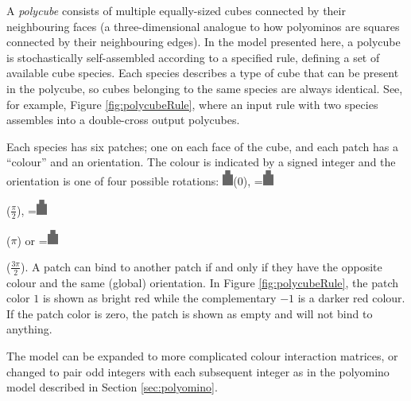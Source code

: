 A \emph{polycube} consists of multiple equally-sized cubes connected by their neighbouring faces (a three-dimensional analogue to how polyominos are squares connected by their neighbouring edges). In the model presented here, a polycube is stochastically self-assembled according to a specified rule, defining a set of available cube species. Each species describes a type of cube that can be present in the polycube, so cubes belonging to the same species are always identical. See, for example, Figure \ref{fig:polycubeRule}, where an input rule with two species assembles into a double-cross output polycubes.

Each species has six patches; one on each face of the cube, and each patch has a ``colour'' and an orientation. The colour is indicated by a signed integer and the orientation is one of four possible rotations: \includegraphics[width=10pt]{figures/face.eps}\hspace{4pt}(\(0\)),
\begingroup{}=\hbox{\includegraphics[width=10pt,angle=-90]{figures/face.eps}}\parbox{\wd0}{}\endgroup\hspace{4pt}(\(\frac{\pi}{2}\)),
\begingroup{}=\hbox{\includegraphics[width=10pt,angle=180]{figures/face.eps}}\parbox{\wd0}{}\endgroup\hspace{4pt}(\(\pi\)) or
\begingroup{}=\hbox{\includegraphics[width=10pt,angle=90]{figures/face.eps}}\parbox{\wd0}{}\endgroup\hspace{4pt}(\(\frac{3\pi}{2}\)). A patch can bind to another patch if and only if they have the opposite colour and the same (global) orientation. In Figure \ref{fig:polycubeRule}, the patch color \(1\) is shown as bright red while the complementary \(-1\) is a darker red colour.  If the patch color is zero, the patch is shown as empty and will not bind to anything.

The model can be expanded to more complicated colour interaction matrices, or changed to pair odd integers with each subsequent integer as in the polyomino model\cite{ahnert2010self,johnston2011evolutionary} described in Section \ref{sec:polyomino}.

